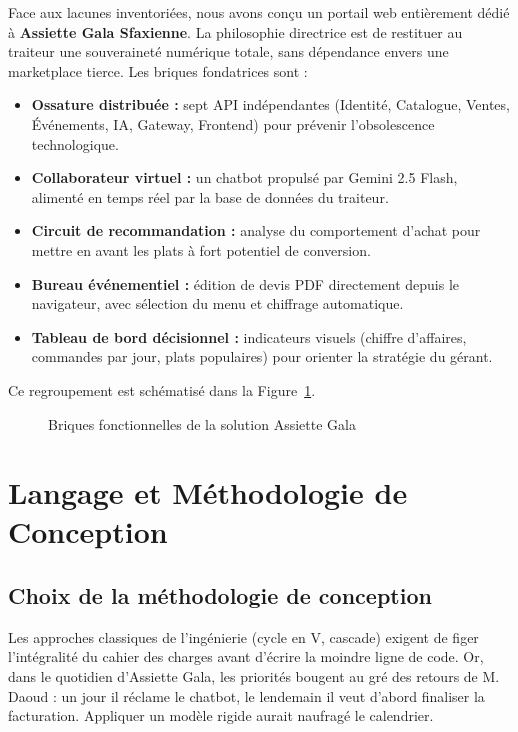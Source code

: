 Face aux lacunes inventoriées, nous avons conçu un portail web entièrement dédié à \textbf{Assiette Gala Sfaxienne}. La philosophie directrice est de restituer au traiteur une souveraineté numérique totale, sans dépendance envers une marketplace tierce. Les briques fondatrices sont :

\begin{itemize}
    \item \textbf{Ossature distribuée :} sept API indépendantes (Identité, Catalogue, Ventes, Événements, IA, Gateway, Frontend) pour prévenir l'obsolescence technologique.
    \item \textbf{Collaborateur virtuel :} un chatbot propulsé par Gemini 2.5 Flash, alimenté en temps réel par la base de données du traiteur.
    \item \textbf{Circuit de recommandation :} analyse du comportement d'achat pour mettre en avant les plats à fort potentiel de conversion.
    \item \textbf{Bureau événementiel :} édition de devis PDF directement depuis le navigateur, avec sélection du menu et chiffrage automatique.
    \item \textbf{Tableau de bord décisionnel :} indicateurs visuels (chiffre d'affaires, commandes par jour, plats populaires) pour orienter la stratégie du gérant.
\end{itemize}

Ce regroupement est schématisé dans la Figure~\ref{fig:solution_overview}.

\begin{figure}[H]
    \centering
    \caption{Briques fonctionnelles de la solution Assiette Gala}
    \label{fig:solution_overview}
\end{figure}

\section{Langage et Méthodologie de Conception}

\subsection{Choix de la méthodologie de conception}

Les approches classiques de l'ingénierie (cycle en V, cascade) exigent de figer l'intégralité du cahier des charges avant d'écrire la moindre ligne de code. Or, dans le quotidien d'Assiette Gala, les priorités bougent au gré des retours de M. Daoud : un jour il réclame le chatbot, le lendemain il veut d'abord finaliser la facturation. Appliquer un modèle rigide aurait naufragé le calendrier.

